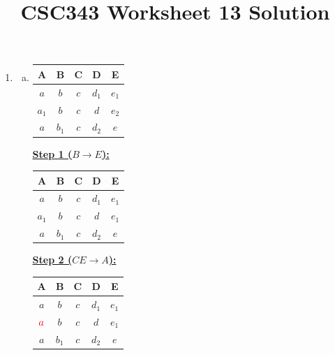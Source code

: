 \documentclass[12pt]{article}
\begin{document}
\title{CSC343 Worksheet 13 Solution}
\maketitle

\begin{enumerate}[1.]
    \item

    \begin{enumerate}[a)]

        \item

        \begin{tabular}{|c|c|c|c|c|}
            \hline
            A & B & C & D & E\\
            \hline
            $a$ & $b$ & $c$ & $d_1$ & $e_1$\\
            \hline
            $a_1$ & $b$ & $c$ & $d$ & $e_2$\\
            \hline
            $a$ & $b_1$ & $c$ & $d_2$ & $e$\\
            \hline
        \end{tabular}

        \bigskip

        \underline{\textbf{Step 1 ($B \to E$):}}

        \bigskip

        \begin{tabular}{|c|c|c|c|c|}
            \hline
            A & B & C & D & E\\
            \hline
            $a$ & $b$ & $c$ & $d_1$ & $e_1$\\
            \hline
            $a_1$ & $b$ & $c$ & $d$ & $e_1$\\
            \hline
            $a$ & $b_1$ & $c$ & $d_2$ & $e$\\
            \hline
        \end{tabular}

        \bigskip

        \underline{\textbf{Step 2 ($CE \to A$):}}

        \bigskip

        \begin{tabular}{|c|c|c|c|c|}
            \hline
            A & B & C & D & E\\
            \hline
            $a$ & $b$ & $c$ & $d_1$ & $e_1$\\
            \hline
            $\color{red}a$ & $b$ & $c$ & $d$ & $e_1$\\
            \hline
            $a$ & $b_1$ & $c$ & $d_2$ & $e$\\
            \hline
        \end{tabular}


\end{enumerate}
\end{enumerate}
\end{document}

